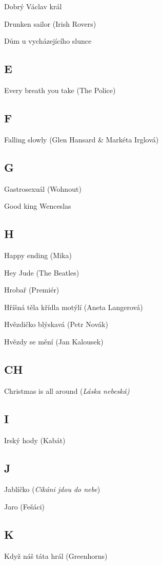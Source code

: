 \begin{multicols}{2}
Dobrý Václav král

Drunken sailor (Irish Rovers)

Dům u vycházejícího slunce

\subsection*{E}
Every breath you take (The Police)

\subsection*{F}
Falling slowly (Glen Hansard \& Markéta Irglová)

\subsection*{G}
Gastrosexuál (Wohnout)

Good king Wenceslas

\subsection*{H}
Happy ending (Mika)

Hey Jude (The Beatles)

Hrobař (Premiér)

Hříšná těla křídla motýlí (Aneta Langerová)

Hvězdičko blýskavá (Petr Novák)

Hvězdy se mění (Jan Kalousek)

\subsection*{CH}
Christmas is all around (\emph{Láska nebeská)}

\subsection*{I}
Irský hody (Kabát)

\subsection*{J}
Jablíčko (\emph{Cikáni jdou do nebe})

Jaro (Fešáci)

\subsection*{K}
Když náš táta hrál (Greenhorns)


\end{multicols}
